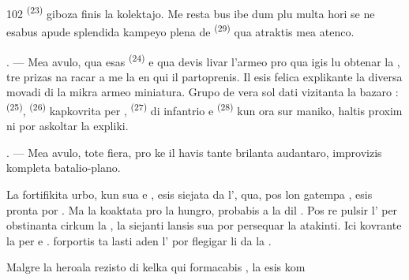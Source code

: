\begin{VUpage}[104]{102}
\VUcontinue
{} \textsuperscript{(23)} giboza finis la kolektajo. Me resta\cc
bus ibe dum plu multa hori se ne esabus apude\nl
splendida kampeyo plena de  \textsuperscript{(29)}\nl
qua atraktis mea atenco.

\VUsaut{4.0mm}
\VUsaut{2.8mm}

. --- Mea avulo, qua esas  \textsuperscript{(24)} e qua\nl
devis livar l'armeo pro  qua igis lu\nl
obtenar la , tre prizas na\cc
racar a me la  en qui il partoprenis.\nl
Il esis felica explikante la diversa movadi di\nl
la mikra armeo miniatura. Grupo de vera sol\cc
dati vizitanta la bazaro :  \textsuperscript{(25)}, \cc
{} \textsuperscript{(26)} kapkovrita per ,\nl
{} \textsuperscript{(27)} di infantrio e \cc
{} \textsuperscript{(28)} kun ora  sur maniko, haltis\nl
proxim ni por askoltar la expliki.

. --- Mea avulo, tote fiera, pro ke il havis\nl
tante brilanta audantaro, improvizis kompleta\nl
batalio-plano.

\VUblancAlinea
La fortifikita urbo, kun sua  e ,\nl
esis siejata da l', qua, pos lon\cc
gatempa , esis pronta por .\nl
Ma la  koaktata pro la hungro, probabis\nl
{} a la  dil . Pos re\cc
pulsir l' per obstinanta  cirkum\nl
la , la  siejanti lansis sua \cc
{} por persequar la  atakinti. Ici\nl
{} kovrante la  per \nl
e .  forportis ta lasti aden\nl
l' por flegigar li da la .

\VUblancAlinea
Malgre la heroala rezisto di kelka \nl
qui formacabis , la  esis kom\ccplein
\end{VUpage}

